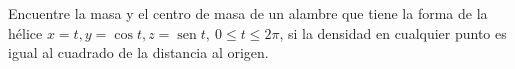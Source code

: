 \item Encuentre la masa y el centro de masa de un alambre que tiene la forma de la hélice $x = t, y = \cos t, z = \operatorname{sen} t, \ 0 \le t \le 2\pi$, si la densidad en cualquier punto es igual al cuadrado de la distancia al origen.
